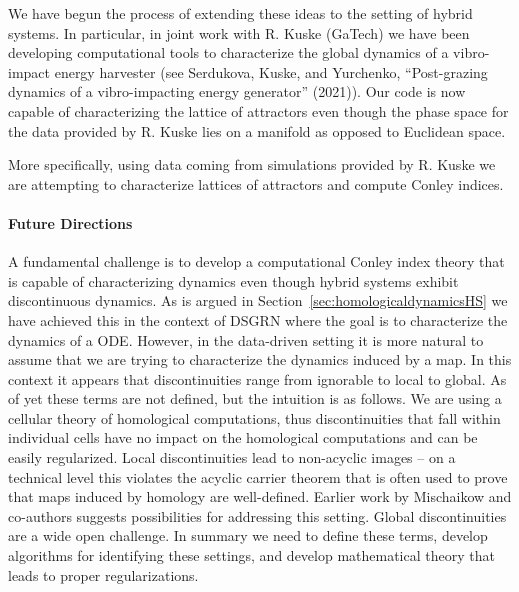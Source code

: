 \documentclass[letterpaper,11pt]{article}
\begin{document}
We have begun the process of extending these ideas to the setting of hybrid systems. 
In particular, in joint work with R. Kuske (GaTech) we have been developing computational tools to characterize the global dynamics of a vibro-impact energy harvester (see Serdukova, Kuske, and Yurchenko, “Post-grazing dynamics of a vibro-impacting energy generator” (2021)).
Our code is now capable of characterizing the lattice of attractors even though the  phase space for the data provided by R. Kuske lies on a manifold as opposed to Euclidean space.

More specifically, using data coming from simulations provided by R. Kuske we are attempting to characterize lattices of attractors and compute Conley indices. 

\paragraph*{Future Directions}
A fundamental challenge is to develop a computational Conley index theory that is capable of characterizing dynamics even though hybrid systems exhibit discontinuous dynamics.
As is argued in Section~\ref{sec:homologicaldynamicsHS} we have achieved this in the context of DSGRN where the goal is to characterize the dynamics of a ODE.
However, in the data-driven setting it is more natural to assume that we are trying to characterize the dynamics induced by a map.
In this context it appears that discontinuities range from ignorable to local to global. 
As of yet these terms are not defined, but the intuition is as follows.
We are using a cellular theory of homological computations, thus discontinuities that fall within individual cells have no impact on the homological computations and can be easily regularized.
Local discontinuities lead to non-acyclic images -- on a technical level this violates the acyclic carrier theorem that is often used to prove that maps induced by homology are well-defined.
Earlier work by Mischaikow and co-authors suggests possibilities for addressing this setting.
Global discontinuities are a wide open challenge.
In summary we need to define these terms, develop algorithms for identifying these settings, and develop mathematical theory that leads to proper regularizations. 
\end{document}
